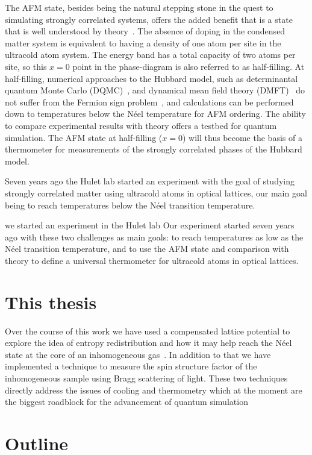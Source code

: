 \documentclass[oneside,11pt]{memoir}
\begin{document}
The AFM state,  besides being the natural stepping stone in the quest to
simulating strongly correlated systems, offers the added benefit that is a
state that is well understood by theory~\cite{Paiva2011, Fuchs2011}.   The
absence of doping in the condensed matter system is equivalent to having a
density of one atom per site in the ultracold atom system.   The energy band
has a total capacity of two atoms per site, so this $x=0$ point in the
phase-diagram is also referred to as half-filling.   At half-filling, numerical
approaches to the Hubbard model, such as determinantal quantum Monte Carlo
(DQMC)~\cite{Paiva2011},  and dynamical mean field theory
(DMFT)~\cite{Fuchs2011} do not suffer from the Fermion sign
problem~\cite{Jr1990}, and calculations can be performed down to temperatures
below the N\'{e}el temperature for AFM ordering. The ability to compare
experimental results with theory offers a testbed for quantum simulation.  The
AFM state at half-filling ($x=0$) will thus become the basis of a thermometer
for measurements of the strongly correlated phases of the Hubbard model.    

Seven years ago the Hulet lab started an experiment with the goal of studying
strongly correlated matter using ultracold atoms in optical lattices, our main
goal being to reach temperatures below the N\'{e}el transition temperature. 

we started an experiment in the Hulet lab Our experiment started seven years ago with these two
challenges as main goals:  to reach temperatures as low as the N\'{e}el
transition temperature, and to use the AFM state and comparison with theory to
define a universal thermometer for ultracold atoms in optical lattices. 

\section{This thesis}

Over the course of this work we have used a compensated lattice potential to
explore the idea of entropy redistribution and how it may help reach the
N\'{e}el state at the core of an inhomogeneous gas~\cite{Paiva2011}.  In
addition to that we have implemented a technique to measure the spin structure
factor of the inhomogeneous sample using Bragg scattering of light.   These two
techniques directly address the issues of cooling and thermometry which at the moment are the biggest roadblock for the advancement of quantum simulation~\cite{McKay2011} 

\section{Outline} 
\end{document}
